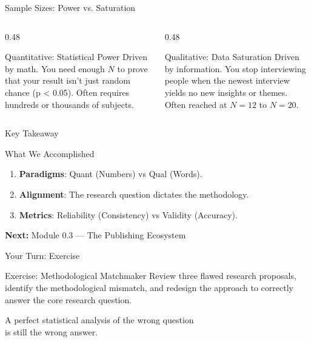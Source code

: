 \documentclass[aspectratio=169]{beamer}
\begin{document}
\begin{frame}{Sample Sizes: Power vs. Saturation}
  \begin{columns}[T]
    \begin{column}{0.48\textwidth}
      \begin{block}{Quantitative: Statistical Power}
        Driven by math. You need enough $N$ to prove that your result isn't just random chance (p < 0.05). Often requires hundreds or thousands of subjects.
      \end{block}
    \end{column}
    \begin{column}{0.48\textwidth}
      \begin{exampleblock}{Qualitative: Data Saturation}
        Driven by information. You stop interviewing people when the newest interview yields no new insights or themes. Often reached at $N=12$ to $N=20$.
      \end{exampleblock}
    \end{column}
  \end{columns}
\end{frame}

\begin{frame}{Key Takeaway}
  \begin{block}{What We Accomplished}
    \begin{enumerate}
      \item \textbf{Paradigms}: Quant (Numbers) vs Qual (Words).
      \item \textbf{Alignment}: The research question dictates the methodology.
      \item \textbf{Metrics}: Reliability (Consistency) vs Validity (Accuracy).
    \end{enumerate}
  \end{block}
  \vspace{0.3cm}
  \textbf{Next:} Module 0.3 --- The Publishing Ecosystem
\end{frame}

\begin{frame}{Your Turn: Exercise}
  \begin{exampleblock}{Exercise: Methodological Matchmaker}
    Review three flawed research proposals, identify the methodological mismatch, and redesign the approach to correctly answer the core research question.
  \end{exampleblock}
\end{frame}

\begin{frame}[standout]
  A perfect statistical analysis of the wrong question\\
  is still the wrong answer.
\end{frame}
\end{document}
